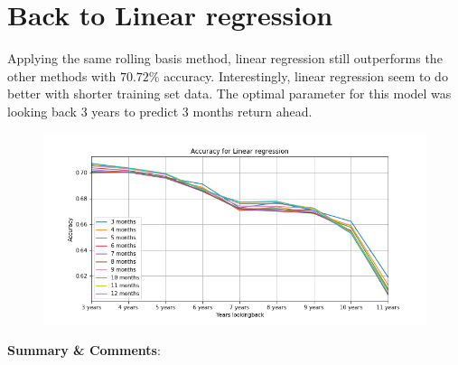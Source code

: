 \documentclass[12pt]{amsart}
\begin{document}
\section*{Back to Linear regression}
Applying the same rolling basis method, linear regression still outperforms the other methods with $70.72\%$ accuracy. Interestingly, linear regression seem to do better with shorter training set data. The optimal parameter for this model was looking back 3 years to predict 3 months return ahead.

\begin{figure}[htb]
	\includegraphics[scale=0.7]{Linear_regression_param.png}
\end{figure}



\newpage

\vskip 8pt \noindent
{\textbf{Summary \& Comments}: }
\vskip 8pt \noindent
\end{document}
